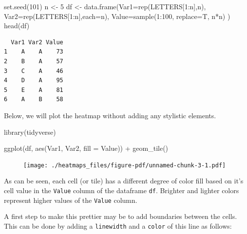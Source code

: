 \documentclass[
  letterpaper,
  DIV=11,
  numbers=noendperiod]{scrreprt}
\newenvironment{Shaded}{\begin{snugshade}}{\end{snugshade}}
\newcommand{\AttributeTok}[1]{\textcolor[rgb]{0.40,0.45,0.13}{#1}}
\newcommand{\DecValTok}[1]{\textcolor[rgb]{0.68,0.00,0.00}{#1}}
\newcommand{\FunctionTok}[1]{\textcolor[rgb]{0.28,0.35,0.67}{#1}}
\newcommand{\NormalTok}[1]{\textcolor[rgb]{0.00,0.23,0.31}{#1}}
\newcommand{\OtherTok}[1]{\textcolor[rgb]{0.00,0.23,0.31}{#1}}
\newcommand{\SpecialCharTok}[1]{\textcolor[rgb]{0.37,0.37,0.37}{#1}}
\begin{document}
\begin{Shaded}
\begin{Highlighting}[]
\FunctionTok{set.seed}\NormalTok{(}\DecValTok{101}\NormalTok{)}
\NormalTok{n }\OtherTok{\textless{}{-}} \DecValTok{5}
\NormalTok{df }\OtherTok{\textless{}{-}} \FunctionTok{data.frame}\NormalTok{(}\AttributeTok{Var1=}\FunctionTok{rep}\NormalTok{(LETTERS[}\DecValTok{1}\SpecialCharTok{:}\NormalTok{n],n),}
                 \AttributeTok{Var2=}\FunctionTok{rep}\NormalTok{(LETTERS[}\DecValTok{1}\SpecialCharTok{:}\NormalTok{n],}\AttributeTok{each=}\NormalTok{n),}
                 \AttributeTok{Value=}\FunctionTok{sample}\NormalTok{(}\DecValTok{1}\SpecialCharTok{:}\DecValTok{100}\NormalTok{, }\AttributeTok{replace=}\NormalTok{T, n}\SpecialCharTok{*}\NormalTok{n)}
\NormalTok{)}
\FunctionTok{head}\NormalTok{(df)}
\end{Highlighting}
\end{Shaded}

\begin{verbatim}
  Var1 Var2 Value
1    A    A    73
2    B    A    57
3    C    A    46
4    D    A    95
5    E    A    81
6    A    B    58
\end{verbatim}

Below, we will plot the heatmap without adding any stylistic elements.

\begin{Shaded}
\begin{Highlighting}[]
\FunctionTok{library}\NormalTok{(tidyverse)}

\FunctionTok{ggplot}\NormalTok{(df, }\FunctionTok{aes}\NormalTok{(Var1, Var2, }\AttributeTok{fill =}\NormalTok{ Value)) }\SpecialCharTok{+} 
  \FunctionTok{geom\_tile}\NormalTok{() }
\end{Highlighting}
\end{Shaded}

\begin{figure}[H]

{\centering \texttt{[image: ./heatmaps\_files/figure-pdf/unnamed-chunk-3-1.pdf]}

}

\end{figure}

As can be seen, each cell (or tile) has a different degree of color fill
based on it's cell value in the \texttt{Value} column of the dataframe
\texttt{df}. Brighter and lighter colors represent higher values of the
\texttt{Value} column.

A first step to make this prettier may be to add boundaries between the
cells. This can be done by adding a \texttt{linewidth} and a
\texttt{color} of this line as follows:
\end{document}
